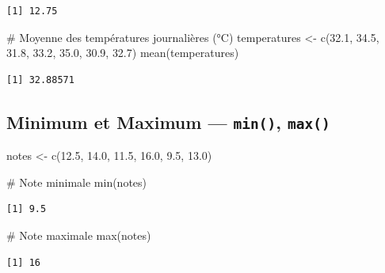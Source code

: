 \documentclass[
  french,
  11pt,
  a4paper,
]{article}
\newenvironment{Shaded}{}{}
\newcommand{\CommentTok}[1]{\textcolor[rgb]{0.42,0.45,0.49}{#1}}
\newcommand{\FloatTok}[1]{\textcolor[rgb]{0.00,0.36,0.77}{#1}}
\newcommand{\FunctionTok}[1]{\textcolor[rgb]{0.44,0.26,0.76}{#1}}
\newcommand{\NormalTok}[1]{\textcolor[rgb]{0.14,0.16,0.18}{#1}}
\newcommand{\OtherTok}[1]{\textcolor[rgb]{0.44,0.26,0.76}{#1}}
\begin{document}
\begin{verbatim}
[1] 12.75
\end{verbatim}

\begin{Shaded}
\begin{Highlighting}[]
\CommentTok{\# Moyenne des températures journalières (°C)}
\NormalTok{temperatures }\OtherTok{\textless{}{-}} \FunctionTok{c}\NormalTok{(}\FloatTok{32.1}\NormalTok{, }\FloatTok{34.5}\NormalTok{, }\FloatTok{31.8}\NormalTok{, }\FloatTok{33.2}\NormalTok{, }\FloatTok{35.0}\NormalTok{, }\FloatTok{30.9}\NormalTok{, }\FloatTok{32.7}\NormalTok{)}
\FunctionTok{mean}\NormalTok{(temperatures)}
\end{Highlighting}
\end{Shaded}

\begin{verbatim}
[1] 32.88571
\end{verbatim}

\subsection{\texorpdfstring{Minimum et Maximum --- \texttt{min()},
\texttt{max()}}{Minimum et Maximum --- min(), max()}}\label{minimum-et-maximum-min-max}

\begin{Shaded}
\begin{Highlighting}[]
\NormalTok{notes }\OtherTok{\textless{}{-}} \FunctionTok{c}\NormalTok{(}\FloatTok{12.5}\NormalTok{, }\FloatTok{14.0}\NormalTok{, }\FloatTok{11.5}\NormalTok{, }\FloatTok{16.0}\NormalTok{, }\FloatTok{9.5}\NormalTok{, }\FloatTok{13.0}\NormalTok{)}

\CommentTok{\# Note minimale}
\FunctionTok{min}\NormalTok{(notes)}
\end{Highlighting}
\end{Shaded}

\begin{verbatim}
[1] 9.5
\end{verbatim}

\begin{Shaded}
\begin{Highlighting}[]
\CommentTok{\# Note maximale}
\FunctionTok{max}\NormalTok{(notes)}
\end{Highlighting}
\end{Shaded}

\begin{verbatim}
[1] 16
\end{verbatim}
\end{document}
